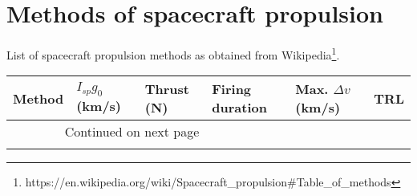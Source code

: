 \chapter{Methods of spacecraft propulsion} \label{sec:methodstable}

List of spacecraft propulsion methods as obtained from Wikipedia\footnote{https://en.wikipedia.org/wiki/Spacecraft\_propulsion\#Table\_of\_methods}.

\begin{landscape}

\begin{longtable}{lllllr}
\toprule
                                            Method &    $I_{sp} g_0$ (km/s) &       Thrust (N) &         Firing duration & Max. $\Delta v$ (km/s) &  TRL \\
\midrule
\endhead
\midrule
\multicolumn{3}{r}{{Continued on next page}} \\
\midrule
\endfoot


\end{longtable}
\end{landscape}
